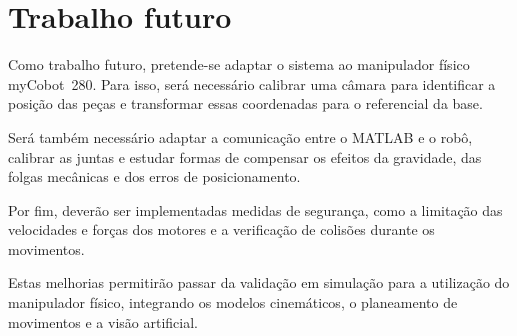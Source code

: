 \section*{Trabalho futuro}

Como trabalho futuro, pretende-se adaptar o sistema ao manipulador físico myCobot~280. Para isso, será necessário calibrar uma câmara para identificar a posição das peças e transformar essas coordenadas para o referencial da base.

Será também necessário adaptar a comunicação entre o MATLAB e o robô, calibrar as juntas e estudar formas de compensar os efeitos da gravidade, das folgas mecânicas e dos erros de posicionamento.

Por fim, deverão ser implementadas medidas de segurança, como a limitação das velocidades e forças dos motores e a verificação de colisões durante os movimentos.

Estas melhorias permitirão passar da validação em simulação para a utilização do manipulador físico, integrando os modelos cinemáticos, o planeamento de movimentos e a visão artificial.
